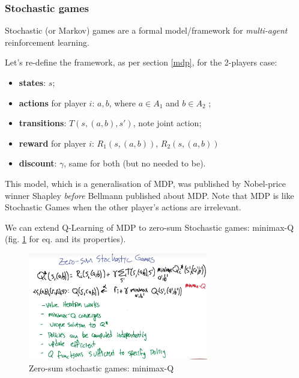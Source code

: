 \documentclass[11pt]{article}
\begin{document}
\subsubsection{Stochastic games}
Stochastic (or Markov) games are a formal model/framework for \textit{multi-agent} reinforcement learning.

Let's re-define the framework, as per section \ref{mdp}, for the 2-players case:
\begin{itemize}
	\item \textbf{states}: $s$;
	\item \textbf{actions} for player $i$: $a, b$, where $a \in A_1$ and $b \in A_2$ ;
	\item \textbf{transitions}: $T(s, (a, b),s')$, note joint action;
	\item \textbf{reward} for player $i$: $R_1(s, (a,b))$, $R_2(s, (a,b))$
	\item \textbf{discount}: $\gamma$, same for both (but no needed to be).
\end{itemize}
This model, which is a generalisation of MDP, was published by Nobel-price winner Shapley \textit{before} Bellmann published about MDP. Note that MDP is like Stochastic Games when the other player's actions are irrelevant.

We can extend Q-Learning of MDP to zero-sum Stochastic games: minimax-Q (fig. \ref{minimax_Q} for eq. and its properties).
\begin{figure}[htbp] 
	\centering
	\includegraphics[width=0.7\textwidth]{pics/minimax_Q}
	\caption{Zero-sum stochastic games: minimax-Q} 
	\label{minimax_Q}
\end{figure}
\end{document}
